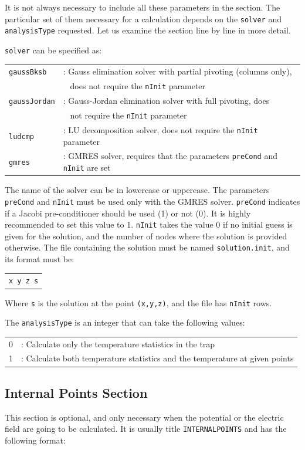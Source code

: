 \documentclass[12pt]{article}
\begin{document}
It is not always necessary to include all these parameters in the section. The particular set of them necessary for a calculation depends on the \verb+solver+ and \verb+analysisType+ requested. Let us examine the section line by line in more detail.

\verb+solver+ can be specified as:

\begin{tabular}{ll}
\texttt{gaussBksb}&: Gauss elimination solver with partial pivoting (columns only),\\
  & \verb+ + does not require the \texttt{nInit} parameter\\
\texttt{gaussJordan}&: Gauss-Jordan elimination solver with full pivoting, does \\
  & \verb+ + not require the \texttt{nInit} parameter\\
\texttt{ludcmp}&: LU decomposition solver, does not require the \texttt{nInit} parameter\\
\texttt{gmres}&: GMRES solver, requires that the parameters \texttt{preCond} and \texttt{nInit} are set
\end{tabular}

The name of the solver can be in lowercase or uppercase. The parameters \verb+preCond+ and \verb+nInit+ must be used only with the GMRES solver. \verb+preCond+ indicates if a Jacobi pre-conditioner should be used (1) or not (0). It is highly recommended to set this value to 1. \verb+nInit+ takes the value 0 if no initial guess is given for the solution, and the number of nodes where the solution is provided otherwise. The file containing the solution must be named \verb+solution.init+, and its format must be:

\begin{tabular}{l}
\texttt{x y z s}
\end{tabular}

Where \verb+s+ is the solution at the point \verb+(x,y,z)+, and the file has \verb+nInit+ rows.

The \verb+analysisType+ is an integer that can take the following values:

\begin{tabular}{rl}
0&: Calculate only the temperature statistics in the trap\\
1&: Calculate both temperature statistics and the temperature at given points\\
\end{tabular}

\subsection{Internal Points Section}
This section is optional, and only necessary when the potential or the electric field are going to be calculated. It is usually title \verb+INTERNALPOINTS+ and has the following format:
\end{document}
